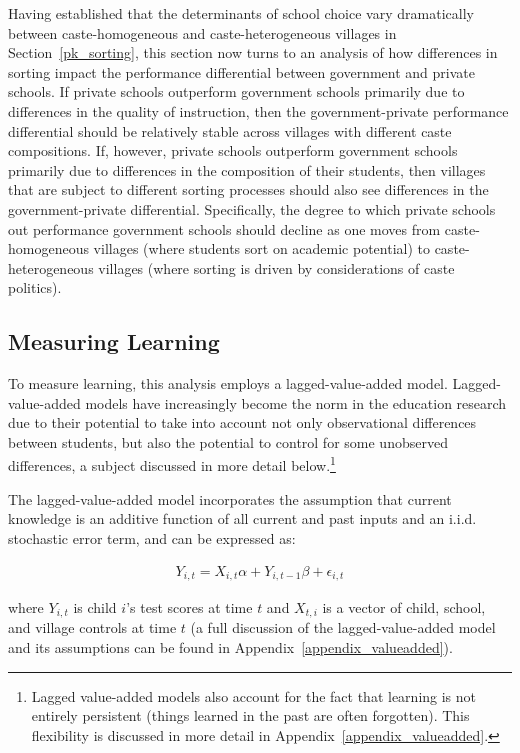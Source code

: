 \documentclass[Eubank_pk_ethnic_sorting.tex]{subfiles}
\begin{document}
Having established that the determinants of school choice vary dramatically between caste-homogeneous and caste-heterogeneous villages in Section~\ref{pk_sorting}, this section now turns to an analysis of how differences in sorting impact the performance differential between government and private schools. If private schools outperform government schools primarily due to differences in the quality of instruction, then the government-private performance differential should be relatively stable across villages with different caste compositions. If, however, private schools outperform government schools primarily due to differences in the composition of their students, then villages that are subject to different sorting processes should also see differences in the government-private differential. Specifically, the degree to which private schools out performance government schools should decline as one moves from caste-homogeneous villages (where students sort on academic potential) to caste-heterogeneous villages (where sorting is driven by considerations of caste politics).

\subsection{Measuring Learning}\label{value_added_models}

To measure learning, this analysis employs a lagged-value-added model. Lagged-value-added models have increasingly become the norm in the education research \citep{Gordon:2006wt,McCaffrey:2003vk,Hanushek:2003hz} due to their potential to take into account not only observational differences between students, but also the potential to control for some unobserved differences, a subject discussed in more detail below.\footnote{Lagged value-added models also account for the fact that learning is not entirely persistent (things learned in the past are often forgotten). This flexibility is discussed in more detail in Appendix~\ref{appendix_valueadded}.}

The lagged-value-added model incorporates the assumption that current knowledge is an additive function of all current and past inputs and an i.i.d. stochastic error term, and can be expressed as:

\begin{eqnarray}
	Y_{i,t}=X_{i,t}\alpha+Y_{i,t-1}\beta + \epsilon_{i,t}\label{primary}
\end{eqnarray}

where $Y_{i,t}$ is child $i$'s test scores at time $t$ and $X_{t,i}$ is a vector of child, school, and village controls at time $t$ (a full discussion of the lagged-value-added model and its assumptions can be found in Appendix~\ref{appendix_valueadded}).
\end{document}
